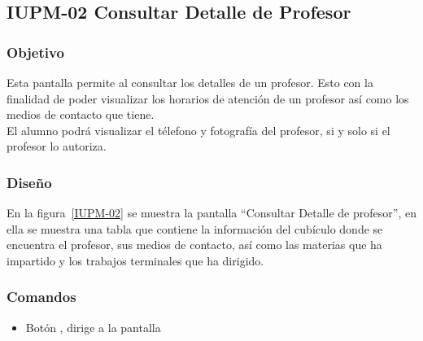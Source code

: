 \subsection{IUPM-02 Consultar Detalle de Profesor}

\subsubsection{Objetivo}

	
    Esta pantalla permite al  consultar los detalles de un profesor. Esto con la finalidad de poder visualizar los horarios de atención de un profesor así como los medios de contacto que tiene.\\
    El alumno podrá visualizar el télefono y fotografía del profesor, si y solo si el profesor lo autoriza.
\subsubsection{Diseño}


    En la figura~\ref{IUPM-02} se muestra la pantalla ``Consultar Detalle de profesor'', en ella se muestra una tabla que contiene la información del cubículo donde se encuentra el profesor, sus medios de contacto, así como las materias que ha impartido y los trabajos terminales que ha dirigido.



\subsubsection{Comandos}
    \begin{itemize}

	\item Botón , dirige a la pantalla 
    \end{itemize}
